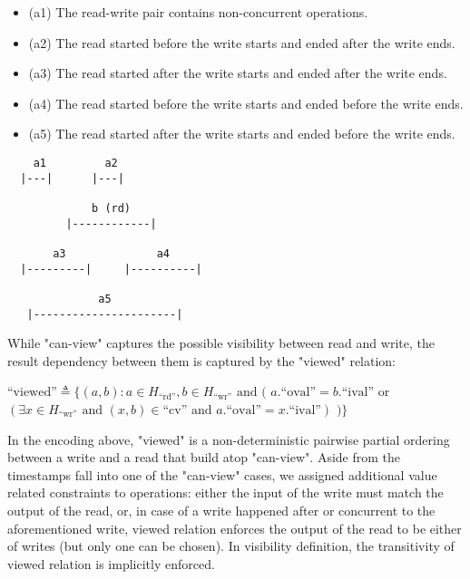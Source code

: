 \begin{itemize}
  \item (a1) The read-write pair contains non-concurrent operations.

  \item (a2) The read started before the write starts and ended after
    the write ends.

  \item (a3) The read started after the write starts and ended after
    the write ends.

  \item (a4) The read started before the write starts and ended
    before the write ends.

  \item (a5) The read started after the write starts and ended before
    the write ends.
\end{itemize}

\begin{center}
\begin{verbatim}
    a1         a2
  |---|      |---|

             b (rd)
         |------------|

       a3              a4
  |---------|     |----------|

              a5
   |----------------------|
\end{verbatim}
\end{center}

While "can-view" captures the possible visibility between read and write, the
result dependency between them is captured by the "viewed" relation:

$\text{``viewed''} \triangleq \{(a, b) : a \in H_\text{``rd''}, b \in
  H_\text{``wr''} \text{ and } ($
    $a.\text{``oval''} = b.\text{``ival''}$
    $\text{or}$
    $(\exists x \in H_\text{``wr''} \text{ and } (x, b) \in
    \text{``cv''} \text{ and } a.\text{``oval''} = x.\text{``ival''})$
$)\}$

In the encoding above, "viewed" is a non-deterministic pairwise partial ordering
between a write and a read that build atop "can-view". Aside from the timestamps
fall into one of the "can-view" cases, we assigned additional value related
constraints to operations: either the input of the write must match the output
of the read, or, in case of a write happened after or concurrent to the
aforementioned write, viewed relation enforces the output of the read to be
either of writes (but only one can be chosen). In visibility definition, the
transitivity of viewed relation is implicitly enforced.

